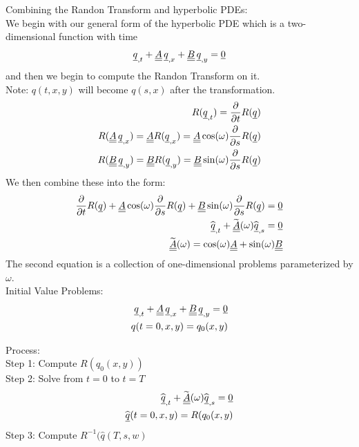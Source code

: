 
Combining the Randon Transform and hyperbolic PDEs: \\ 
We begin with our general form of the hyperbolic PDE which is a two-dimensional function with time
\begin{align*}
{\underline{q}}_{,t} + {\underline{\underline{A}}}\,{\underline{q}}_{,x} + {\underline{\underline{B}}}\,{\underline{q}}_{,y} = {\underline{0}}
\end{align*}
and then we begin to compute the Randon Transform on it. \\ 
Note: $q(t,x,y)$ will become $q(s,x)$ after the transformation. \\

\begin{align*}
R({\underline{q}}_{,t}) = \frac{\partial}{\partial t} R({\underline{q}}) \\
R({\underline{\underline{A}}}\,{\underline{q}}_{,x}) = {\underline{\underline{A}}}R({\underline{q}}_{,x}) = {\underline{\underline{A}}}\cos(\omega)\frac{\partial}{\partial s}R({\underline{q}}) \\
R({\underline{\underline{B}}}\,{\underline{q}}_{,y}) = {\underline{\underline{B}}}R({\underline{q}}_{,y}) = {\underline{\underline{B}}}\sin(\omega)\frac{\partial}{\partial s}R({\underline{q}}) \\
\end{align*}
We then combine these into the form:
\begin{align*}
\frac{\partial}{\partial t} R({\underline{q}}) + {\underline{\underline{A}}}\cos(\omega)\frac{\partial}{\partial s}R({\underline{q}}) + {\underline{\underline{B}}}\sin(\omega)\frac{\partial}{\partial s}R({\underline{q}}) = {\underline{0}} \\
\widehat{{\underline{q}}}_{,t} + \widetilde{{\underline{\underline{A}}}}(\omega)\widehat{{\underline{q}}}_{,s} = {\underline{0}} \\
\widetilde{{\underline{\underline{A}}}}(\omega) = \cos(\omega){\underline{\underline{A}}} + \sin(\omega){\underline{\underline{B}}}
\end{align*}
The second equation is a collection of one-dimensional problems parameterized by $\omega$. \\

Initial Value Problems:
\begin{align*}
{\underline{q}}_{,t} + {\underline{\underline{A}}}\,{\underline{q}}_{,x} + {\underline{\underline{B}}}\,{\underline{q}}_{,y} = {\underline{0}} \\
q(t=0,x,y) = q_0(x,y)
\end{align*}

Process: \\
Step 1: Compute $R(q_0(x,y))$ \\
Step 2: Solve from $t=0$ to $t=T$
\begin{align*}
\widehat{{\underline{q}}}_{,t} + \widetilde{{\underline{\underline{A}}}}(\omega)\widehat{{\underline{q}}}_{,s} = {\underline{0}} \\
\widehat{{\underline{q}}}(t=0,x,y) = R(q_0(x,y)
\end{align*}
Step 3: Compute $R^{-1}(\widehat{q}(T,s,w)$